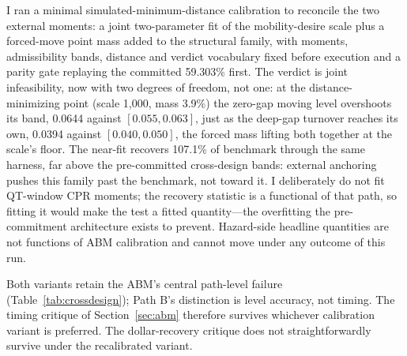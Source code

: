 I ran a minimal simulated-minimum-distance calibration to reconcile the two external moments: a joint two-parameter fit of the mobility-desire scale plus a forced-move point mass added to the structural family, with moments, admissibility bands, distance and verdict vocabulary fixed before execution and a parity gate replaying the committed 59.303\% first. The verdict is joint infeasibility, now with two degrees of freedom, not one: at the distance-minimizing point (scale 1{,}000, mass 3.9\%) the zero-gap moving level overshoots its band, 0.0644 against $[0.055, 0.063]$, just as the deep-gap turnover reaches its own, 0.0394 against $[0.040, 0.050]$, the forced mass lifting both together at the scale's floor. The near-fit recovers 107.1\% of benchmark through the same harness, far above the pre-committed cross-design bands: external anchoring pushes this family past the benchmark, not toward it. I deliberately do not fit QT-window CPR moments; the recovery statistic is a functional of that path, so fitting it would make the test a fitted quantity---the overfitting the pre-commitment architecture exists to prevent. Hazard-side headline quantities are not functions of ABM calibration and cannot move under any outcome of this run.

Both variants retain the ABM's central path-level failure (Table~\ref{tab:crossdesign}); Path B's distinction is level accuracy, not timing. The timing critique of Section~\ref{sec:abm} therefore survives whichever calibration variant is preferred. The dollar-recovery critique does not straightforwardly survive under the recalibrated variant.
